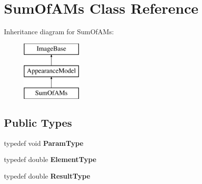 \hypertarget{classSumOfAMs}{\section{Sum\-Of\-A\-Ms Class Reference}
\label{classSumOfAMs}
}
Inheritance diagram for Sum\-Of\-A\-Ms\-:\begin{figure}[H]
\begin{center}
\leavevmode
\includegraphics[height=3.000000cm]{classSumOfAMs}
\end{center}
\end{figure}
\subsection*{Public Types}
\begin{DoxyCompactItemize}
\item 
\hypertarget{classSumOfAMs_a991843e6790f4613b50e339a4181ee15}{typedef void {\bfseries Param\-Type}}\label{classSumOfAMs_a991843e6790f4613b50e339a4181ee15}

\item 
\hypertarget{classSumOfAMs_a46d12c9281768c3d14a7f3f13a168f61}{typedef double {\bfseries Element\-Type}}\label{classSumOfAMs_a46d12c9281768c3d14a7f3f13a168f61}

\item 
\hypertarget{classSumOfAMs_aa84abf4d79962bee8fe2968ca6552676}{typedef double {\bfseries Result\-Type}}\label{classSumOfAMs_aa84abf4d79962bee8fe2968ca6552676}

\end{DoxyCompactItemize}
